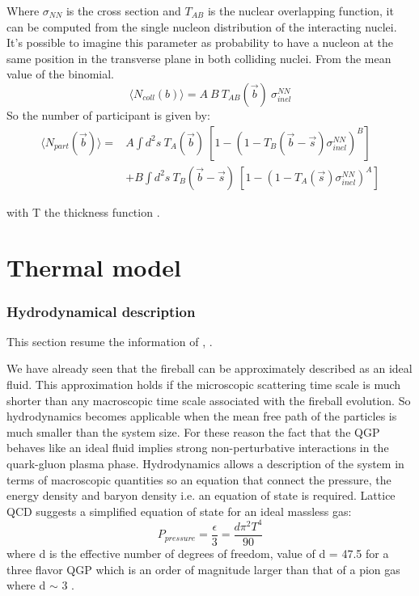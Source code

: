\documentclass[12pt,a4paper]{book}
\begin{document}
	Where $\sigma_{NN}$ is the cross section and $T_{AB}$ is the nuclear overlapping function, it can be computed from the single nucleon distribution of the interacting nuclei. It's possible to imagine this parameter as probability to have a nucleon at the same position in the transverse plane in both colliding nuclei. From the mean value of the binomial.
	\begin{equation}
		\langle N_{coll}(b) \rangle = A\ B \ T_{AB}(\vec{b}) \ \sigma_{inel}^{NN}
		\label{eq:num_collisione}
	\end{equation}
	So the number of participant is given by:
	\begin{equation}
		\begin{aligned}
			\langle N_{part}(\vec{b}) \rangle = & A \int d^2 s \ T_{A}(\vec{b}) \ \left[1-\left( 1 - T_{B}(\vec{b}-\vec{s}) \sigma_{inel}^{NN} \right)^B \right] \\
			& + B \int d^2 s \ T_{B}(\vec{b}-\vec{s}) \ \left[1-\left( 1 - T_{A}(\vec{s}) \sigma_{inel}^{NN} \right)^A \right]
		\end{aligned}
		\label{eq:num_partecipant}
	\end{equation}
	
	with T the  thickness function \cite{Arata:2922803}.
	
	\chapter{Thermal model}
	\subsection{Hydrodynamical description}
	This section resume the information of \cite{heinz2004conceptsheavyionphysics}, \cite{phdthesis}.
	
	We have already seen that the fireball can be approximately described as an ideal fluid. This approximation holds if the microscopic scattering time scale is much shorter than any macroscopic time scale associated with the fireball evolution. So hydrodynamics becomes applicable when the mean free path of the particles is much smaller than the system size. For these reason the fact that the QGP behaves like an ideal fluid implies strong non-perturbative interactions in the quark-gluon plasma phase. Hydrodynamics allows a description of the system in terms of macroscopic quantities so an equation that connect the pressure, the energy density and baryon density i.e. an equation of state is required. Lattice QCD suggests a simplified equation of state for an ideal massless gas:
	\begin{equation}
		P_{pressure}=\frac{\epsilon}{3}=\frac{d \pi^2 T^4}{90}
		\label{eq:EoS}
	\end{equation}
	where d is the effective number of degrees of freedom, value of d = 47.5 for a three flavor QGP which is an order of magnitude larger than that of a pion gas where d $\sim$ 3 \cite{Snellings_2011}.
	
\end{document}

